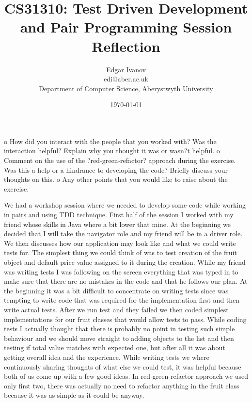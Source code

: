 \documentclass[]{report}
\begin{document}
\title{CS31310: Test Driven Development and Pair Programming Session Reflection}
\author{Edgar Ivanov\\ edi@aber.ac.uk \\ Department of Computer Science, Aberystwyth University}
\date{\today}
\maketitle
o  How	did	you	interact	with	the	people	that	you	worked	with?	Was	the	
interaction	helpful?	Explain	why	you	thought	it	was	or	wasn?t	helpful.	
o  Comment	on	the	use	of	the	?red-green-refactor?	approach	during	the	exercise.	
Was	this	a	help	or	a	hindrance	to	developing	the	code?	Briefly	discuss	your	
thoughts	on	this.	
o  Any	other	points	that	you	would	like	to	raise	about	the	exercise.		

We had a workshop session where we needed to develop some code while working in pairs and using TDD technique. First half of the session I worked with my friend whose skills in Java where a bit lower that mine. At the beginning we decided that I will take the navigator role and my friend will be in a driver role. We then discusses how our application may look like and what we could write tests for. The simplest thing we could think of was to test creation of the fruit object and default price value assigned to it during the creation. While my friend was writing tests I was following on the screen everything that was typed in to make sure that there are no mistakes in the code and that he follows our plan.  At the beginning it was a bit difficult to concentrate on writing tests since was tempting to write code that was required for the implementation first and then write actual tests. After we run test and they failed we then coded simplest implementations for our fruit classes that would allow tests to pass. While coding tests I actually thought that there is probably no point in testing such simple behaviour and we should move straight to adding objects to the list and then testing if total value matches with expected one, but after all it was about getting overall idea and the experience. While writing tests we where continuously sharing thoughts of what else we could test, it was helpful because both of us come up with a few good ideas. In red-green-refactor approach we used only first two, there was actually no need to refactor anything in the fruit class because it was as simple as it could be anyway.        



\end{document}
